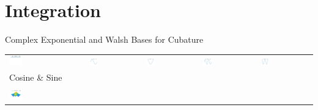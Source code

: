 \documentclass[11pt,compress,xcolor={usenames,dvipsnames},aspectratio=169]{beamer}
\newcommand{\app}{A}
\newcommand{\Sapp}{S_{\textup{app}}}
\begin{document}




\section{Integration}

\begin{frame}{Complex Exponential and Walsh Bases for Cubature}
\vspace{-3ex}
	\begin{tabular}{>{\centering}m{}>{\centering}m{}>{\centering}m{}>{\centering}m{}>{\centering}m{}}
		\includegraphics[width =0.18\textwidth]{ProgramsImages/CosineSine_Degree_0.png}  &
		\includegraphics[width =0.18\textwidth]{ProgramsImages/CosineSine_Degree_1.png}  &
		\includegraphics[width =0.18\textwidth]{ProgramsImages/CosineSine_Degree_2.png}  &
		\includegraphics[width =0.18\textwidth]{ProgramsImages/CosineSine_Degree_3.png}  &
		\includegraphics[width =0.18\textwidth]{ProgramsImages/CosineSine_Degree_4.png} 
	\tabularnewline[-7ex]
	Cosine \& Sine
	\tabularnewline
	\tabularnewline
		\includegraphics[width =0.18\textwidth]{ProgramsImages/CosineSine_Degree_1_1.png}  &

\end{tabular}
\end{frame}
\end{document}
